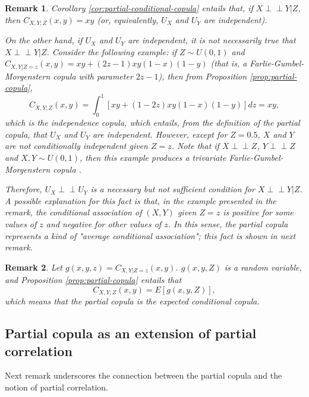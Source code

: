 \documentclass[
]{article}
\newtheorem{remark}{Remark}
\begin{document}
\begin{remark}\label{rem:partial-copula-necessary-not-sufficient}
Corollary \ref{cor:partial-conditional-copula} entails that, if $X \perp\!\!\!\perp Y | Z$, then $C_{X,Y;Z}(x, y) = xy$ (or, equivalently, $U_X$ and $U_Y$ are independent).

On the other hand, if $U_X$ and $U_Y$ are independent, it is not necessarily true that $X \perp\!\!\!\perp Y | Z$. Consider the following example: if $Z \sim U(0,1)$ and $C_{X,Y|Z=z}(x, y) = xy + (2z - 1)xy(1-x)(1-y)$ (that is, a Farlie-Gumbel-Morgenstern copula with parameter $2z - 1$), then from Proposition \ref{prop:partial-copula},
$$C_{X,Y;Z}(x, y) = \int_0^1 [xy + (1-2z)xy(1-x)(1-y)] dz = xy,$$
which is the independence copula, which entails, from the definition of the partial copula, that $U_X$ and $U_Y$ are independent. However, except for $Z = 0.5$, $X$ and $Y$ are not conditionally independent given $Z = z$. Note that if $X \perp\!\!\!\perp Z$, $Y \perp\!\!\!\perp Z$ and $X,Y \sim U(0,1)$, then this example produces a trivariate Farlie-Gumbel-Morgenstern copula .


Therefore, $U_X\perp\!\!\!\perp U_Y$ is a necessary but not sufficient condition for $X \perp\!\!\!\perp Y | Z$. A possible explanation for this fact is that, in the example presented in the remark, the conditional association of $(X, Y)$ given $Z = z$ is positive for some values of $z$ and negative for other values of $z$. In this sense, the partial copula represents a kind of "average conditional association"; this fact is shown in next remark.
\end{remark}

\begin{remark}\label{rem:partial-copula-expected-conditional-copula}
Let $g(x, y, z) = C_{X,Y|Z=z}(x, y)$. $g(x, y, Z)$ is a random variable, and Proposition \ref{prop:partial-copula} entails that
$$C_{X,Y;Z}(x, y) = E[g(x, y, Z)],$$
which means that the partial copula is the expected conditional copula.
\end{remark}

\subsection{Partial copula as an extension of partial
correlation}\label{partial-copula-as-an-extension-of-partial-correlation}

Next remark underscores the connection between the partial copula and
the notion of partial correlation.
\end{document}
